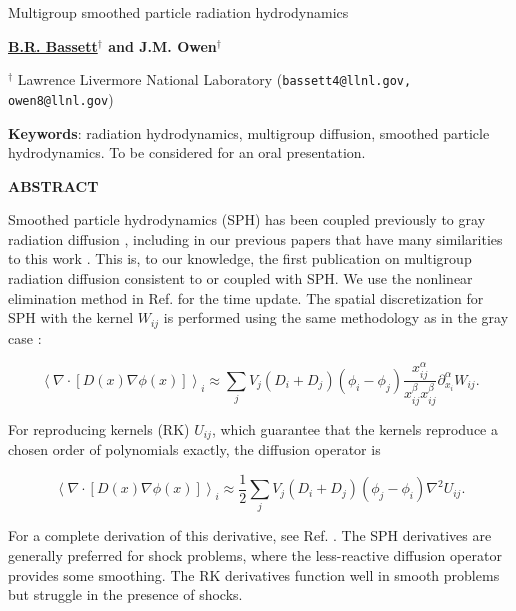 \documentclass[11pt]{article}
\newenvironment{AbstractTitle}{\begin{center} \bf \par\Large}{\par\addvspace{\bigskipamount} \end{center}}
\begin{document}
\pagestyle{empty}

\begin{AbstractTitle}
  Multigroup smoothed particle radiation hydrodynamics
\end{AbstractTitle}

%
%
\begin{center}
\textbf{\underline{B.R. Bassett}$^\dagger$ and J.M. Owen$^\dagger$}

$^\dagger${
  Lawrence Livermore National Laboratory
             ({\tt bassett4@llnl.gov, owen8@llnl.gov}) 
          } \\
\end{center}

{\bf Keywords}: radiation hydrodynamics, multigroup diffusion, smoothed particle hydrodynamics.
To be considered for an oral presentation.

\begin{center}
\textbf{ABSTRACT}\\[1mm]
\end{center}

Smoothed particle hydrodynamics (SPH) has been coupled previously to gray radiation diffusion \cite{whitehouse}, including in our previous papers that have many similarities to this work \cite{bassett1, bassett2}. This is, to our knowledge, the first publication on multigroup radiation diffusion consistent to or coupled with SPH. We use the nonlinear elimination method in Ref. \cite{brunner} for the time update. The spatial discretization for SPH with the kernel $W_{ij}$ is performed using the same methodology as in the gray case \cite{bassett1}:

\[
\left\langle \nabla\cdot\left[D\left(x\right)\nabla\phi\left(x\right)\right]\right\rangle _{i}\approx\sum_{j}V_{j}\left(D_{i}+D_{j}\right)\left(\phi_{i}-\phi_{j}\right)\frac{x_{ij}^{\alpha}}{x_{ij}^{\beta}x_{ij}^{\beta}}\partial_{x_{i}}^{\alpha}W_{ij}.
\]

For reproducing kernels (RK) $U_{ij}$, which guarantee that the kernels reproduce a chosen order of polynomials exactly, the diffusion operator is 

\[
\left\langle \nabla\cdot\left[D\left(x\right)\nabla\phi\left(x\right)\right]\right\rangle _{i}\approx\frac{1}{2}\sum_{j}V_{j}\left(D_{i}+D_{j}\right)\left(\phi_{j}-\phi_{i}\right)\nabla^{2}U_{ij}.
\]

For a complete derivation of this derivative, see Ref. \cite{bassett3}. The SPH derivatives are generally preferred for shock problems, where the less-reactive diffusion operator provides some smoothing. The RK derivatives function well in smooth problems but struggle in the presence of shocks. 
\end{document}
